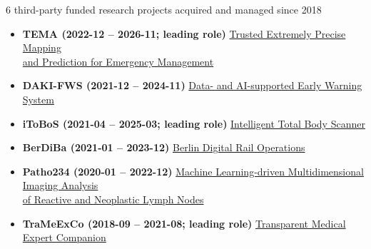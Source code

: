 
\ifdefined\shortcv
    {\hspace*{\fill} 6 third-party funded research projects acquired and managed since 2018}
\else
    \begin{itemize}
        \item [] \textbf{TEMA (2022-12 -- 2026-11; leading role)}
                \href{https://www.hhi.fraunhofer.de/en/departments/ai/projects/tema.html}{
                    \hspace*{\fill} Trusted Extremely Precise Mapping\\
                    \hspace*{\fill}  and Prediction for Emergency Management}

        \item [] \textbf{DAKI-FWS (2021-12 -- 2024-11)}
                \href{https://www.hhi.fraunhofer.de/en/departments/ai/projects/daki-fws.html}{\hspace*{\fill} Data- and AI-supported Early Warning System}
    
        \item [] \textbf{iToBoS (2021-04 -- 2025-03; leading role)}
                \href{https://www.hhi.fraunhofer.de/en/departments/ai/projects/itobos.html}{\hspace*{\fill} Intelligent Total Body Scanner}

        \item [] \textbf{BerDiBa (2021-01 -- 2023-12)}
                \href{https://www.hhi.fraunhofer.de/en/departments/ai/projects/berdiba.html}{\hspace*{\fill} Berlin Digital Rail Operations}


        \item [] \textbf{Patho234 (2020-01 -- 2022-12)}
                \href{https://www.hhi.fraunhofer.de/en/departments/ai/projects/patho234.html}{
                    \hspace*{\fill} Machine Learning-driven Multidimensional Imaging Analysis\\
                    \hspace*{\fill} of Reactive  and Neoplastic Lymph Nodes}

        \item [] \textbf{TraMeExCo (2018-09 -- 2021-08; leading role)}
                \href{https://www.hhi.fraunhofer.de/en/departments/ai/projects/trameexco.html}{\hspace*{\fill}Transparent Medical Expert Companion}

    \end{itemize}
\fi